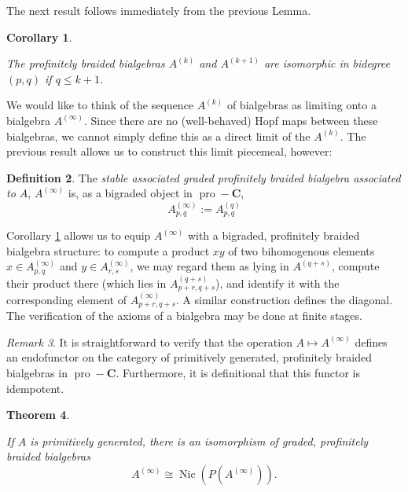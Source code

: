 \documentclass[12pt]{article}
\DeclareMathOperator{\Nic}{Nic}
\DeclareMathOperator{\pro}{pro}
\newcommand{\bC} {\mathbf{C}}
\newcommand{\proC}{\pro\!-\bC}
\theoremstyle{plain}
\newtheorem{thm}{Theorem}[section]
\newtheorem{cor}[thm]{Corollary}
\theoremstyle{definition}
\newtheorem{defn}[thm]{Definition}
\theoremstyle{remark}
\newtheorem{rem}[thm]{Remark}
\begin{document}
The next result follows immediately from the previous Lemma.

\begin{cor} \label{stability_cor}

The profinitely braided bialgebras $A^{(k)}$ and $A^{(k+1)}$ are isomorphic in bidegree $(p, q)$ if $q \leq k+1$.

\end{cor}

We would like to think of the sequence $A^{(k)}$ of bialgebras as limiting onto a bialgebra $A^{(\infty)}$.  Since there are no (well-behaved) Hopf maps between these bialgebras, we cannot simply define this as a direct limit of the $A^{(k)}$.  The previous result allows us to construct this limit piecemeal, however:

\begin{defn}

The \emph{stable associated graded profinitely braided bialgebra associated to $A$}, $A^{(\infty)}$ is, as a bigraded object in $\proC$, 
%
$$A^{(\infty)}_{p, q} := A^{(q)}_{p, q}$$

\end{defn}

Corollary \ref{stability_cor} allows us to equip $A^{(\infty)}$ with a bigraded, profinitely braided bialgebra structure: to compute a product $xy$ of two bihomogenous elements $x \in A^{(\infty)}_{p, q}$ and $y \in A^{(\infty)}_{r, s}$, we may regard them as lying in $A^{(q+s)}$, compute their product there (which lies in $A^{(q+s)}_{p+r, q+s}$), and identify it with the corresponding element of $A^{(\infty)}_{p+r, q+s}$.  A similar construction defines the diagonal.  The verification of the axioms of a bialgebra may be done at finite stages.

\begin{rem} It is straightforward to verify that the operation $A \mapsto A^{(\infty)}$ defines an endofunctor on the category of primitively generated, profinitely braided bialgebras in $\proC$. Furthermore, it is definitional that this functor is idempotent.
\end{rem}

\begin{thm} \label{infty_Nichols_thm}

If $A$ is primitively generated, there is an isomorphism of graded, profinitely braided bialgebras
%
$$A^{(\infty)} \cong \Nic(P(A^{(\infty)})).$$

\end{thm}
\end{document}
